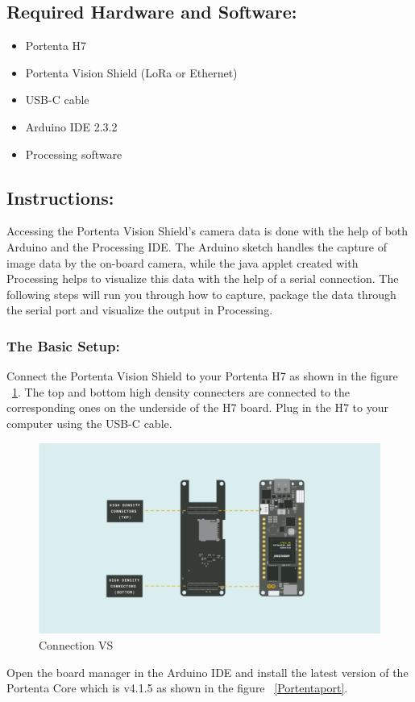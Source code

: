 \subsection{Required Hardware and Software:}
\begin{itemize}
	\item Portenta H7
	\item Portenta Vision Shield (LoRa or Ethernet)
	\item USB-C cable
	\item Arduino IDE 2.3.2
	\item Processing software \cite{portentaVisionShieldCamera:2024}
\end{itemize}
\subsection{Instructions:}
Accessing the Portenta Vision Shield's camera data is done with the help of both Arduino and the Processing IDE. The Arduino sketch handles the capture of image data by the on-board camera, while the java applet created with Processing helps to visualize this data with the help of a serial connection. The following steps will run you through how to capture, package the data through the serial port and visualize the output in Processing. \cite{portentaVisionShieldCamera:2024}

	\subsubsection{The Basic Setup:} Connect the Portenta Vision Shield to your Portenta H7 as shown in the figure ~\ref{Connection VS}. The top and bottom high density connecters are connected to the corresponding ones on the underside of the H7 board. Plug in the H7 to your computer using the USB-C cable. \cite{portentaVisionShieldCamera:2024}
	\begin{figure}
		\begin{center}
			\includegraphics[width=0.7\linewidth]{Images/VisionShield/Connection VS.png}
			\caption{Connection VS}
			\label{Connection VS}
		\end{center}
	\end{figure}
	\newline
	Open the board manager in the Arduino IDE and install the latest version of the Portenta Core which is v4.1.5 as shown in the figure ~\ref{Portentaport}.
	
